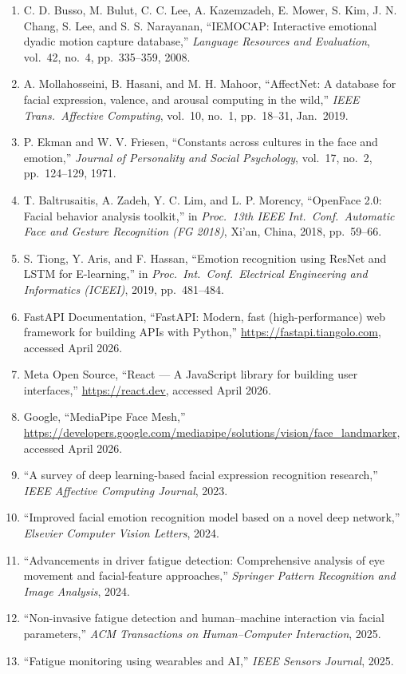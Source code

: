 \begin{enumerate}
\item C. D. Busso, M. Bulut, C. C. Lee, A. Kazemzadeh, E. Mower,
S. Kim, J. N. Chang, S. Lee, and S. S. Narayanan, ``IEMOCAP: Interactive
emotional dyadic motion capture database,'' \textit{Language Resources and
Evaluation}, vol.\ 42, no.\ 4, pp.\ 335--359, 2008.

\item A. Mollahosseini, B. Hasani, and M. H. Mahoor, ``AffectNet: A
database for facial expression, valence, and arousal computing in the wild,''
\textit{IEEE Trans.\ Affective Computing}, vol.\ 10, no.\ 1, pp.\ 18--31,
Jan.\ 2019.

\item P. Ekman and W. V. Friesen, ``Constants across cultures in the face
and emotion,'' \textit{Journal of Personality and Social Psychology},
vol.\ 17, no.\ 2, pp.\ 124--129, 1971.

\item T. Baltrusaitis, A. Zadeh, Y. C. Lim, and L. P. Morency,
``OpenFace 2.0: Facial behavior analysis toolkit,'' in \textit{Proc.\
13th IEEE Int.\ Conf.\ Automatic Face and Gesture Recognition (FG 2018)},
Xi'an, China, 2018, pp.\ 59--66.

\item S. Tiong, Y. Aris, and F. Hassan, ``Emotion recognition using ResNet
and LSTM for E-learning,'' in \textit{Proc.\ Int.\ Conf.\ Electrical
Engineering and Informatics (ICEEI)}, 2019, pp.\ 481--484.

\item FastAPI Documentation, ``FastAPI: Modern, fast (high-performance)
web framework for building APIs with Python,''
\url{https://fastapi.tiangolo.com}, accessed April 2026.

\item Meta Open Source, ``React --- A JavaScript library for building
user interfaces,'' \url{https://react.dev}, accessed April 2026.

\item Google, ``MediaPipe Face Mesh,''
\url{https://developers.google.com/mediapipe/solutions/vision/face_landmarker},
accessed April 2026.

\item ``A survey of deep learning-based facial expression recognition research,'' \textit{IEEE Affective Computing Journal}, 2023.

\item ``Improved facial emotion recognition model based on a novel deep network,'' \textit{Elsevier Computer Vision Letters}, 2024.

\item ``Advancements in driver fatigue detection: Comprehensive analysis of eye movement and facial-feature approaches,'' \textit{Springer Pattern Recognition and Image Analysis}, 2024.

\item ``Non-invasive fatigue detection and human–machine interaction via facial parameters,'' \textit{ACM Transactions on Human–Computer Interaction}, 2025.

\item ``Fatigue monitoring using wearables and AI,'' \textit{IEEE Sensors Journal}, 2025.

\end{enumerate}
